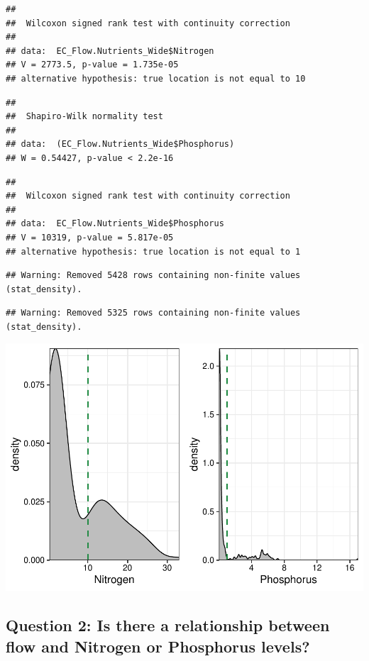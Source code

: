\documentclass[12pt,]{article}
\begin{document}
\begin{verbatim}
## 
##  Wilcoxon signed rank test with continuity correction
## 
## data:  EC_Flow.Nutrients_Wide$Nitrogen
## V = 2773.5, p-value = 1.735e-05
## alternative hypothesis: true location is not equal to 10
\end{verbatim}

\begin{verbatim}
## 
##  Shapiro-Wilk normality test
## 
## data:  (EC_Flow.Nutrients_Wide$Phosphorus)
## W = 0.54427, p-value < 2.2e-16
\end{verbatim}

\begin{verbatim}
## 
##  Wilcoxon signed rank test with continuity correction
## 
## data:  EC_Flow.Nutrients_Wide$Phosphorus
## V = 10319, p-value = 5.817e-05
## alternative hypothesis: true location is not equal to 1
\end{verbatim}

\begin{verbatim}
## Warning: Removed 5428 rows containing non-finite values (stat_density).
\end{verbatim}

\begin{verbatim}
## Warning: Removed 5325 rows containing non-finite values (stat_density).
\end{verbatim}

\includegraphics{Landman_ENV872_Project_files/figure-latex/unnamed-chunk-7-1.pdf}

\hypertarget{question-2-is-there-a-relationship-between-flow-and-nitrogen-or-phosphorus-levels}{%
\subsection{Question 2: Is there a relationship between flow and
Nitrogen or Phosphorus
levels?}\label{question-2-is-there-a-relationship-between-flow-and-nitrogen-or-phosphorus-levels}}
\end{document}
